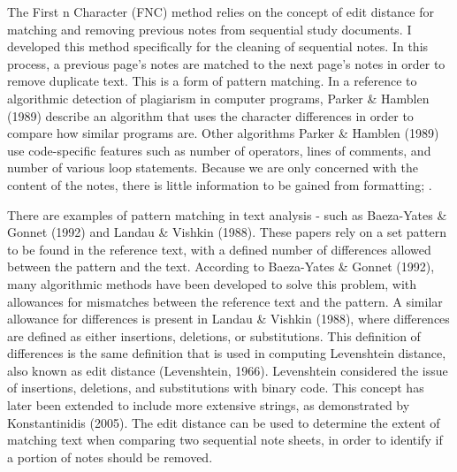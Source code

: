 \documentclass[print]{nuthesis}
\begin{document}
The First n Character (FNC) method relies on the concept of edit distance for matching and removing previous notes from sequential study documents.
I developed this method specifically for the cleaning of sequential notes.
In this process, a previous page's notes are matched to the next page's notes in order to remove duplicate text.
This is a form of pattern matching.
In a reference to algorithmic detection of plagiarism in computer programs, Parker \& Hamblen (1989) describe an algorithm that uses the character differences in order to compare how similar programs are.
Other algorithms  Parker \& Hamblen (1989) use code-specific features such as number of operators, lines of comments, and number of various loop statements.
Because we are only concerned with the content of the notes, there is little information to be gained from formatting; .

There are  examples of pattern matching in text analysis - such as Baeza-Yates \& Gonnet (1992) and Landau \& Vishkin (1988).
These papers rely on a set pattern to be found in the reference text, with a defined number of differences allowed between the pattern and the text.
According to Baeza-Yates \& Gonnet (1992), many algorithmic methods have been developed to solve this problem, with allowances for mismatches between the reference text and the pattern.
A similar allowance for differences is present in Landau \& Vishkin (1988), where differences are defined as either insertions, deletions, or substitutions.
This definition of differences is the same definition that is used in computing Levenshtein distance, also known as edit distance (Levenshtein, 1966).
Levenshtein considered the issue of insertions, deletions, and substitutions with binary code.
This concept has later been extended to include more extensive strings, as demonstrated by Konstantinidis (2005).
The edit distance can be used to determine the extent of matching text when comparing two sequential note sheets, in order to identify if a portion of notes should be removed.
\end{document}
